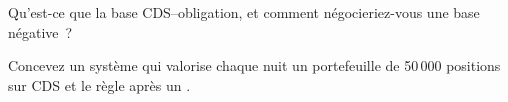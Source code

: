 \begin{interviewq}\label{iq:m2:credit-default-swaps:5}
Qu'est-ce que la base CDS--obligation, et comment négocieriez-vous une base négative~?
\end{interviewq}

\begin{interviewq}\label{iq:m2:credit-default-swaps:6}
Concevez un système qui valorise chaque nuit un portefeuille de 50\,000 positions sur CDS et le règle
après un .
\end{interviewq}
